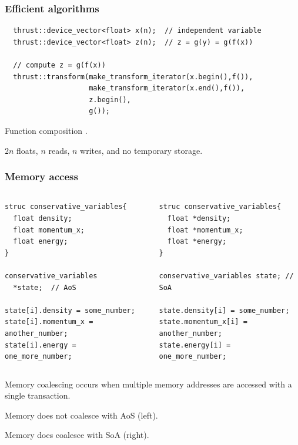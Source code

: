 \documentclass{beamer}
\begin{document}
\begin{frame}[fragile]
\frametitle{Efficient algorithms}

\begin{lstlisting}
  thrust::device_vector<float> x(n);  // independent variable
  thrust::device_vector<float> z(n);  // z = g(y) = g(f(x))

  // compute z = g(f(x))
  thrust::transform(make_transform_iterator(x.begin(),f()),
                    make_transform_iterator(x.end(),f()),
                    z.begin(),
                    g());
\end{lstlisting} 

\bei
\item Function composition \citep{Thrust}.
\item $2n$ floats, $n$ reads, $n$ writes, and no temporary storage.
\ebi
\end{frame}

\begin{frame}[fragile]
\frametitle{Memory access}
\begin{columns}
\begin{column}{0.5\textwidth}
\begin{lstlisting}
struc conservative_variables{
  float density;
  float momentum_x;
  float energy;
}

conservative_variables 
  *state;  // AoS

state[i].density = some_number;
state[i].momentum_x = another_number;
state[i].energy = one_more_number;
\end{lstlisting} 
\end{column}
\begin{column}{0.5\textwidth}
\begin{lstlisting}
struc conservative_variables{
  float *density;
  float *momentum_x;
  float *energy;
}

conservative_variables state; // SoA

state.density[i] = some_number;
state.momentum_x[i] = another_number;
state.energy[i] = one_more_number;
\end{lstlisting} 
\end{column}
\end{columns}
\bei
\item Memory coalescing occurs when multiple memory addresses are accessed with a single transaction.
\item Memory does not coalesce with AoS (left).
\item Memory does coalesce with SoA (right).
\ebi
\end{frame}
\end{document}

